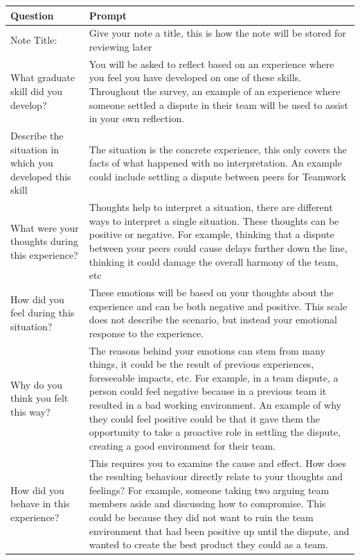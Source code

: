 \documentclass{l4proj}
\begin{document}
\begin{appendices}
\begin{center}
    \begin{tabular}{ | m{8em} | m{10cm}| } 
    \hline
    \textbf{Question} & \textbf{Prompt} \\ [0.5ex] 
    \hline\hline
    Note Title: & Give your note a title, this is how the note will be stored for reviewing later \\ 
    \hline
    What graduate skill did you develop? & You will be asked to reflect based on an experience where you feel you have developed on one of these skills. Throughout the survey, an example of an experience where someone settled a dispute in their team will be used to assist in your own reflection. \\
    \hline
    Describe the situation in which you developed this skill & The situation is the concrete experience, this only covers the facts of what happened with no interpretation. An example could include settling a dispute between peers for Teamwork \\
    \hline
    What were your thoughts during this experience? & Thoughts help to interpret a situation, there are different ways to interpret a single situation. These thoughts can be positive or negative. For example, thinking that a dispute between your peers could cause delays further down the line, thinking it could damage the overall harmony of the team, etc \\
    \hline
    How did you feel during this situation? & These emotions will be based on your thoughts about the experience and can be both negative and positive. This scale does not describe the scenario, but instead your emotional response to the experience. \\
    \hline
    Why do you think you felt this way? & The reasons behind your emotions can stem from many things, it could be the result of previous experiences, foreseeable impacts, etc. For example, in a team dispute, a person could feel negative because in a previous team it resulted in a bad working environment. An example of why they could feel positive could be that it gave them the opportunity to take a proactive role in settling the dispute, creating a good environment for their team. \\
    \hline
    How did you behave in this experience? & This requires you to examine the cause and effect.  How does the resulting behaviour directly relate to your thoughts and feelings? For example, someone taking two arguing team members aside and discussing how to compromise. This could be because they did not want to ruin the team environment that had been positive up until the dispute, and wanted to create the best product they could as a team. \\

\end{tabular}
\end{center}
\end{appendices}
\end{document}
